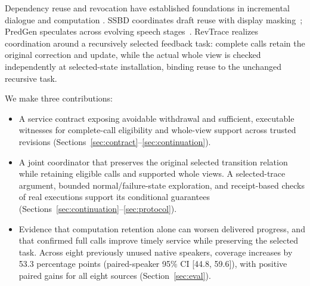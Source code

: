 Dependency reuse and revocation have established foundations in
incremental dialogue and computation
\cite{schlangen2011incremental,hammer2014adapton,hammer2015names}.
SSBD coordinates draft reuse with display masking~\cite{zeng2026ssbd};
PredGen speculates across evolving speech stages~\cite{li2025predgen}.
RevTrace realizes coordination around a recursively selected feedback
task: complete calls retain the original correction and update, while
the actual whole view is checked independently at selected-state
installation, binding reuse to the unchanged recursive task.

We make three contributions:
\begin{itemize}
\item A service contract exposing avoidable withdrawal and sufficient,
  executable witnesses for complete-call eligibility and whole-view
  support across trusted revisions
  (Sections~\ref{sec:contract}--\ref{sec:continuation}).
\item A joint coordinator that preserves the original selected transition
  relation while retaining eligible calls and supported whole views.
  A selected-trace argument, bounded normal/failure-state exploration,
  and receipt-based checks of real executions support its conditional
  guarantees
  (Sections~\ref{sec:continuation}--\ref{sec:protocol}).
\item Evidence that computation retention alone can worsen delivered
  progress, and that confirmed full calls improve timely service while
  preserving the selected task. Across eight previously unused native
  speakers, coverage increases by 53.3 percentage points
  (paired-speaker 95\% CI [44.8, 59.6]), with positive paired gains for all
  eight sources (Section~\ref{sec:eval}).
\end{itemize}

